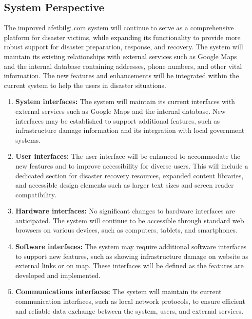 \documentclass[11pt,a4paper]{article}
\begin{document}
\subsection{System Perspective}
The improved afetbilgi.com system will continue to serve as a comprehensive platform for disaster victims, while expanding its functionality to provide more robust support for disaster preparation, response, and recovery. The system will maintain its existing relationships with external services such as Google Maps and the internal database containing addresses, phone numbers, and other vital information. The new features and enhancements will be integrated within the current system to help the users in disaster situations.

\begin{enumerate}[label=(\alph*)]

    \item \textbf{System interfaces:}
    The system will maintain its current interfaces with external services such as Google Maps and the internal database. New interfaces may be established to support additional features, such as infrastructure damage information and its integration with local government systems.
    
    \item \textbf{User interfaces:}
    The user interface will be enhanced to accommodate the new features and to improve accessibility for diverse users. This will include a dedicated section for disaster recovery resources, expanded content libraries, and accessible design elements such as larger text sizes and screen reader compatibility.
    
    \item \textbf{Hardware interfaces:}
    No significant changes to hardware interfaces are anticipated. The system will continue to be accessible through standard web browsers on various devices, such as computers, tablets, and smartphones.
    
    \item \textbf{Software interfaces:}
    The system may require additional software interfaces to support new features, such as showing infrastructure damage on website as external links or on map. These interfaces will be defined as the features are developed and implemented.
    
    \item \textbf{Communications interfaces:}
    The system will maintain its current communication interfaces, such as local network protocols, to ensure efficient and reliable data exchange between the system, users, and external services.
    

\end{enumerate}
\end{document}
